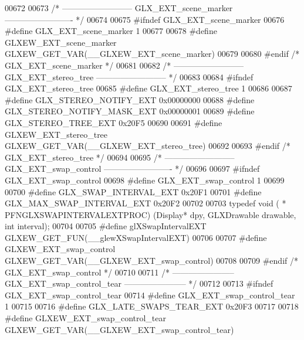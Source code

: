 \begin{DoxyCode}
00672 
00673 \textcolor{comment}{/* -------------------------- GLX\_EXT\_scene\_marker ------------------------- */}
00674 
00675 \textcolor{preprocessor}{#ifndef GLX\_EXT\_scene\_marker}
00676 \textcolor{preprocessor}{#define GLX\_EXT\_scene\_marker 1}
00677 
00678 \textcolor{preprocessor}{#define GLXEW\_EXT\_scene\_marker GLXEW\_GET\_VAR(\_\_GLXEW\_EXT\_scene\_marker)}
00679 
00680 \textcolor{preprocessor}{#endif }\textcolor{comment}{/* GLX\_EXT\_scene\_marker */}\textcolor{preprocessor}{}
00681 
00682 \textcolor{comment}{/* -------------------------- GLX\_EXT\_stereo\_tree -------------------------- */}
00683 
00684 \textcolor{preprocessor}{#ifndef GLX\_EXT\_stereo\_tree}
00685 \textcolor{preprocessor}{#define GLX\_EXT\_stereo\_tree 1}
00686 
00687 \textcolor{preprocessor}{#define GLX\_STEREO\_NOTIFY\_EXT 0x00000000}
00688 \textcolor{preprocessor}{#define GLX\_STEREO\_NOTIFY\_MASK\_EXT 0x00000001}
00689 \textcolor{preprocessor}{#define GLX\_STEREO\_TREE\_EXT 0x20F5}
00690 
00691 \textcolor{preprocessor}{#define GLXEW\_EXT\_stereo\_tree GLXEW\_GET\_VAR(\_\_GLXEW\_EXT\_stereo\_tree)}
00692 
00693 \textcolor{preprocessor}{#endif }\textcolor{comment}{/* GLX\_EXT\_stereo\_tree */}\textcolor{preprocessor}{}
00694 
00695 \textcolor{comment}{/* -------------------------- GLX\_EXT\_swap\_control ------------------------- */}
00696 
00697 \textcolor{preprocessor}{#ifndef GLX\_EXT\_swap\_control}
00698 \textcolor{preprocessor}{#define GLX\_EXT\_swap\_control 1}
00699 
00700 \textcolor{preprocessor}{#define GLX\_SWAP\_INTERVAL\_EXT 0x20F1}
00701 \textcolor{preprocessor}{#define GLX\_MAX\_SWAP\_INTERVAL\_EXT 0x20F2}
00702 
00703 \textcolor{keyword}{typedef} void ( * PFNGLXSWAPINTERVALEXTPROC) (Display* dpy, GLXDrawable drawable, \textcolor{keywordtype}{int} interval);
00704 
00705 \textcolor{preprocessor}{#define glXSwapIntervalEXT GLXEW\_GET\_FUN(\_\_glewXSwapIntervalEXT)}
00706 
00707 \textcolor{preprocessor}{#define GLXEW\_EXT\_swap\_control GLXEW\_GET\_VAR(\_\_GLXEW\_EXT\_swap\_control)}
00708 
00709 \textcolor{preprocessor}{#endif }\textcolor{comment}{/* GLX\_EXT\_swap\_control */}\textcolor{preprocessor}{}
00710 
00711 \textcolor{comment}{/* ----------------------- GLX\_EXT\_swap\_control\_tear ----------------------- */}
00712 
00713 \textcolor{preprocessor}{#ifndef GLX\_EXT\_swap\_control\_tear}
00714 \textcolor{preprocessor}{#define GLX\_EXT\_swap\_control\_tear 1}
00715 
00716 \textcolor{preprocessor}{#define GLX\_LATE\_SWAPS\_TEAR\_EXT 0x20F3}
00717 
00718 \textcolor{preprocessor}{#define GLXEW\_EXT\_swap\_control\_tear GLXEW\_GET\_VAR(\_\_GLXEW\_EXT\_swap\_control\_tear)}

\end{DoxyCode}
